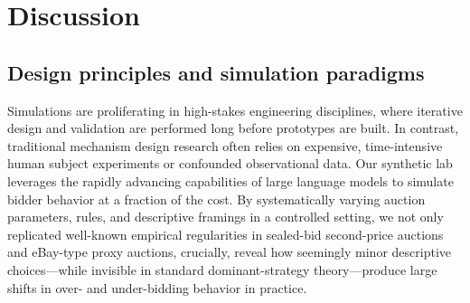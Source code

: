\documentclass{article} %
\begin{document}




\section{Discussion}



\subsection{Design principles and simulation paradigms}

Simulations are proliferating in high-stakes engineering disciplines, where iterative design and validation are performed long before prototypes are built. 
In contrast, traditional mechanism design research often relies on expensive, time-intensive human subject experiments or confounded observational data. 
Our synthetic lab leverages the rapidly advancing capabilities of large language models to simulate bidder behavior at a fraction of the cost. 
By systematically varying auction parameters, rules, and descriptive framings in a controlled setting, we not only replicated well-known empirical regularities in sealed-bid second-price auctions and eBay-type proxy auctions, crucially, reveal how seemingly minor descriptive choices—while invisible in standard dominant-strategy theory—produce large shifts in over- and under-bidding behavior in practice.
\end{document}
